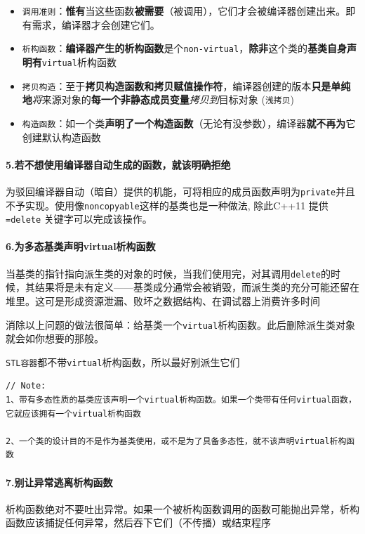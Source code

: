 \documentclass[UTF8,a4paper,12pt]{ctexbook}
\begin{document}
			\begin{itemize}
				\item \verb|调用准则|：\textbf{惟有}当这些函数\textbf{被需要}（被调用），它们才会被编译器创建出来。即有需求，编译器才会创建它们。
				\item \verb|析构函数|：\textbf{编译器产生的析构函数}是个\verb|non-virtual|，\textbf{除非}这个类的\textbf{基类自身声明有}\verb|virtual|析构函数
				\item \verb|拷贝构造|：至于\textbf{拷贝构造函数和拷贝赋值操作符}，编译器创建的版本\textbf{只是单纯地}\textit{将}来源对象的\textbf{每一个非静态成员变量}\textit{拷贝到}目标对象 (\verb|浅拷贝|)
				\item \verb|构造函数|：如一个类\textbf{声明了一个构造函数}（无论有没参数），编译器\textbf{就不再为}它创建默认构造函数
			\end{itemize}
				
		\paragraph{5.若不想使用编译器自动生成的函数，就该明确拒绝} 为驳回编译器自动（暗自）提供的机能，可将相应的成员函数声明为\verb|private|并且不予实现。使用像\verb|noncopyable|这样的基类也是一种做法, 除此C++11 提供\verb|=delete| 关键字可以完成该操作。
			
		\paragraph{6.为多态基类声明virtual析构函数} 当基类的指针指向派生类的对象的时候，当我们使用完，对其调用\verb|delete|的时候，其结果将是未有定义——基类成分通常会被销毁，而派生类的充分可能还留在堆里。这可是形成资源泄漏、败坏之数据结构、在调试器上消费许多时间
			
			消除以上问题的做法很简单：给基类一个\verb|virtual|析构函数。此后删除派生类对象就会如你想要的那般。
			
			 \verb|STL容器|都不带\verb|virtual|析构函数，所以最好别派生它们
			 
		\begin{lstlisting}[frame = lbrT,xleftmargin=.02\textwidth]
// Note:
1、带有多态性质的基类应该声明一个virtual析构函数。如果一个类带有任何virtual函数，它就应该拥有一个virtual析构函数

2、一个类的设计目的不是作为基类使用，或不是为了具备多态性，就不该声明virtual析构函数
		\end{lstlisting}
				 
		\paragraph{7.别让异常逃离析构函数} 析构函数绝对不要吐出异常。如果一个被析构函数调用的函数可能抛出异常，析构函数应该捕捉任何异常，然后吞下它们（不传播）或结束程序
		
\end{document}
